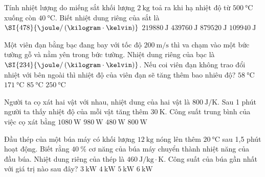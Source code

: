 \begin{ex}
	Tính nhiệt lượng do miếng sắt khối lượng $\SI{2}{\kilogram}$ toả ra khi hạ nhiệt độ từ $\SI{500}{\celsius}$ xuống còn $\SI{40}{\celsius}$. Biết nhiệt dung riêng của sắt là $\SI{478}{\joule/\left(\kilogram\cdot\kelvin\right)}$
	\choice
	{$\SI{219880}{\joule}$}
	{\True $\SI{439760}{\joule}$}
	{$\SI{879520}{\joule}$}
	{$\SI{109940}{\joule}$}
\end{ex}
\begin{ex}
	Một viên đạn bằng bạc đang bay với tốc độ $\SI{200}{\meter/\second}$ thì va chạm vào một bức tường gỗ và nằm yên trong bức tường. Nhiệt dung riêng của bạc là $\SI{234}{\joule/\left(\kilogram\cdot\kelvin\right)}$. Nếu coi viên đạn không trao đổi nhiệt với bên ngoài thì nhiệt độ của viên đạn sẽ tăng thêm bao nhiêu độ?
	\choice
	{$\SI{58}{\celsius}$}
	{$\SI{171}{\celsius}$}
	{\True $\SI{85}{\celsius}$}
	{$\SI{250}{\celsius}$}
\end{ex}
\begin{ex}
	Người ta cọ xát hai vật với nhau, nhiệt dung của hai vật là $\SI{800}{\joule/\kelvin}$. Sau 1 phút người ta thấy nhiệt độ của mỗi vật tăng thêm $\SI{30}{\kelvin}$. Công suất trung bình của việc cọ xát bằng
	\choice
	{$\SI{1080}{\watt}$}
	{$\SI{980}{\watt}$}
	{$\SI{480}{\watt}$}
	{\True $\SI{800}{\watt}$}
\end{ex}
\begin{ex}
	Đầu thép của một búa máy có khối lượng $\SI{12}{\kilogram}$ nóng lên thêm $\SI{20}{\celsius}$ sau 1,5 phút hoạt động. Biết rằng  $\SI{40}{\percent}$ cơ năng của búa máy chuyển thành nhiệt năng của đầu búa. Nhiệt dung riêng của thép là $\SI{460}{\joule/\kilogram\cdot\kelvin}$. Công suất của búa gần nhất với giá trị nào sau đây?
	\choice
	{\True $\SI{3}{\kilo\watt}$}
	{$\SI{4}{\kilo\watt}$}
	{$\SI{5}{\kilo\watt}$}
	{$\SI{6}{\kilo\watt}$}
\end{ex}
